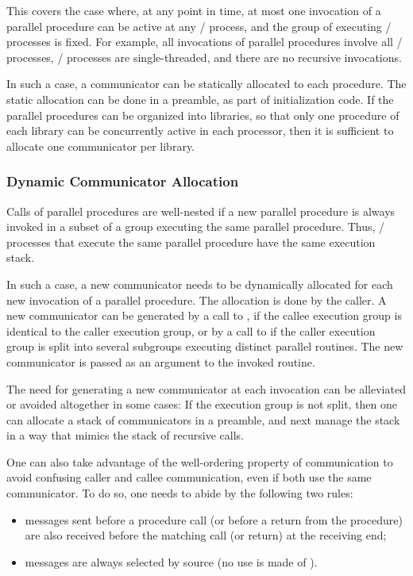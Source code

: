 This covers the case where, at any point in time, at most one
invocation of a parallel procedure can be active at any \MPI/ process, and
the group of executing \MPI/ processes is fixed.
For example, all
invocations of parallel procedures involve all \MPI/ processes, \MPI/ processes
are single-threaded, and there are no recursive invocations.

In such a case, a communicator can be statically allocated to each
procedure. The static allocation can be done in a preamble, as part
of initialization code. If the
parallel procedures can be organized into libraries, so that only one
procedure of each library can be concurrently active in each
processor, then it is sufficient to allocate one communicator per library.

\subsubsection{Dynamic Communicator Allocation}
\label{sec:context:dynamic-comm}

Calls of parallel procedures are well-nested if a new parallel
procedure is always invoked in a subset of a group executing the same
parallel procedure. Thus, \MPI/ processes that execute the same parallel
procedure have the same execution stack.

In such a case, a new communicator needs to be dynamically allocated
for each new invocation of a parallel procedure.
The allocation is done by the caller.
A new communicator can be generated by a call to
, if the callee execution group is identical
to the caller execution group, or by a call to
 if the caller execution group is split into
several subgroups executing distinct parallel routines.
The new communicator is passed as an argument to the invoked routine.

The need for generating a new communicator at each invocation can be
alleviated or avoided altogether in some cases: If the execution
group is not split, then one can allocate a stack of communicators in
a preamble, and next manage the stack in a way that mimics
the stack of recursive calls.

One can also take advantage of the
well-ordering property of communication to avoid confusing caller and
callee communication, even if both use the same communicator. To do
so, one needs to abide by the following two rules:
\begin{itemize}
\item
messages sent before a procedure call (or before a return from the
procedure)
are also received before the matching call (or return) at the
receiving end;
\item
messages are always selected by source (no use is made of
).
\end{itemize}

